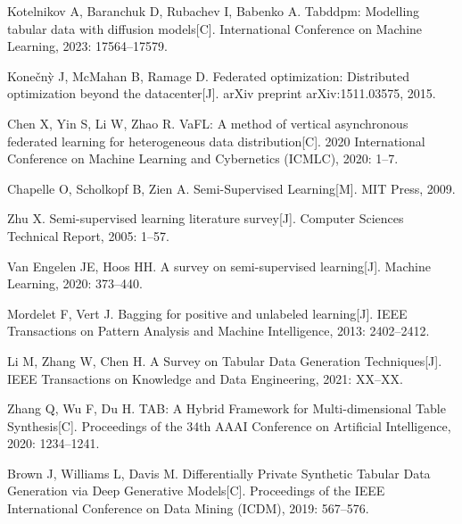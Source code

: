 \begin{thebibliography}{200}
	Kotelnikov A, Baranchuk D, Rubachev I, Babenko A. Tabddpm: Modelling tabular data with diffusion models[C]. International Conference on Machine Learning, 2023: 17564--17579.
	
	Kone{\v{c}}n{\`y} J, McMahan B, Ramage D. Federated optimization: Distributed optimization beyond the datacenter[J]. arXiv preprint arXiv:1511.03575, 2015.
	
	Chen X, Yin S, Li W, Zhao R. VaFL: A method of vertical asynchronous federated learning for heterogeneous data distribution[C]. 2020 International Conference on Machine Learning and Cybernetics (ICMLC), 2020: 1--7.
	
	Chapelle O, Scholkopf B, Zien A. Semi-Supervised Learning[M]. MIT Press, 2009.
	
	Zhu X. Semi-supervised learning literature survey[J]. Computer Sciences Technical Report, 2005: 1--57.
	
	Van Engelen JE, Hoos HH. A survey on semi-supervised learning[J]. Machine Learning, 2020: 373--440.
	
	Mordelet F, Vert J. Bagging for positive and unlabeled learning[J]. IEEE Transactions on Pattern Analysis and Machine Intelligence, 2013: 2402--2412.
	
	Li M, Zhang W, Chen H. A Survey on Tabular Data Generation Techniques[J]. IEEE Transactions on Knowledge and Data Engineering, 2021: XX--XX.
	
	Zhang Q, Wu F, Du H. TAB: A Hybrid Framework for Multi-dimensional Table Synthesis[C]. Proceedings of the 34th AAAI Conference on Artificial Intelligence, 2020: 1234--1241.
	
	Brown J, Williams L, Davis M. Differentially Private Synthetic Tabular Data Generation via Deep Generative Models[C]. Proceedings of the IEEE International Conference on Data Mining (ICDM), 2019: 567--576.
	
	
	
	
	
	
\end{thebibliography}

\clearpage